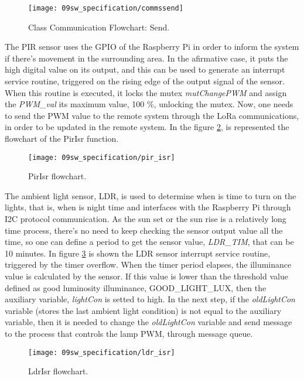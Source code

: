 \begin{figure}[H]
	\centering	
	\texttt{[image: 09sw\_specification/commssend]}
	\caption{Class Communication Flowchart: Send.}
	\label{fig:flow_send}
\end{figure}



The PIR sensor uses the GPIO of the Raspberry Pi in order to inform the system if there's movement in the surrounding area. In the afirmative case, it puts the high digital value on its output, and this can be used to generate an interrupt service routine, triggered on the rising edge of the output signal of the sensor. When this routine is executed, it locks the mutex \textit{mutChangePWM} and assign the \textit{PWM\_val} its maximum value, 100 \%, unlocking the mutex. Now, one needs to send the PWM value to the remote system through the LoRa communications, in order to be updated in the remote system. In the figure \ref{fig:pir_isr}, is represented the flowchart of the PirIsr function.

\begin{figure}[H]
	\centering
	\texttt{[image: 09sw\_specification/pir\_isr]}
	\caption{PirIsr flowchart.}
	\label{fig:pir_isr}
\end{figure}

The ambient light sensor, LDR, is used to determine when is time to turn on the lights, that is, when is night time and interfaces with the Raspberry Pi through I2C protocol communication. As the sun set or the sun rise is a relatively long time process, there's no need to keep checking the sensor output value all the time, so one can define a period to get the sensor value, \textit{LDR\_TIM}, that can be 10 minutes. In figure \ref{fig:ldr_isr} is shown the LDR sensor interrupt service routine, triggered by the timer overflow. When the timer period elapses, the illuminance value is calculated by the sensor. If this value is lower than the threshold value defined as good luminosity illuminance, GOOD\_LIGHT\_LUX, then the auxiliary variable, \textit{lightCon} is setted to high. In the next step, if the \textit{oldLightCon} variable (stores the last ambient light condition) is not equal to the auxiliary variable, then it is needed to change the \textit{oldLightCon} variable and send message to the process that controls the lamp PWM, through message queue. 

\begin{figure}[H]
	\centering
	\texttt{[image: 09sw\_specification/ldr\_isr]}
	\caption{LdrIsr flowchart.}
	\label{fig:ldr_isr}
\end{figure}

